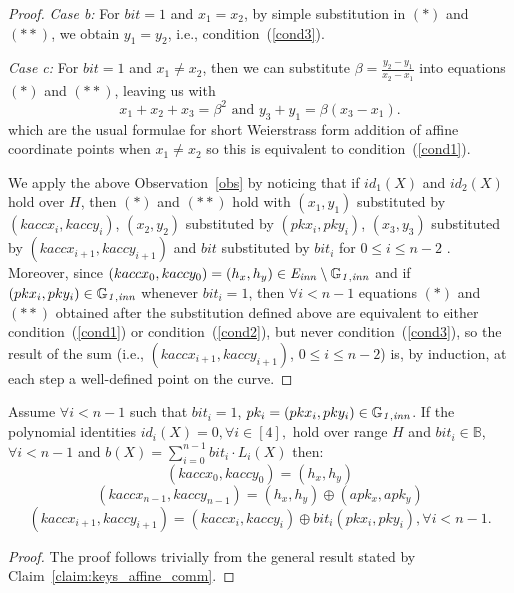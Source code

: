 \begin{proof}
\noindent \textit{Case b:} For $\mathit{bit}=1$ and $x_1=x_2$, by simple substitution in $(\ast)$ and $(\ast \ast)$, 
we obtain $y_1 = y_2$, i.e., condition~(\ref{cond3}).  \\
\vspace{-0.1in}

\noindent \textit{Case c:} For $\mathit{bit}=1$ and $x_1 \neq x_2$, then we can substitute
$\beta=\frac{y_2-y_1}{x_2-x_1}$ into equations $(\ast)$ and $(\ast \ast)$, leaving us with
$$x_1+x_2+x_3=\beta^2 \textrm{ and } y_3+y_1=\beta(x_3-x_1).$$
which are the usual formulae for short Weierstrass form addition of affine coordinate points when $x_1 \neq x_2$ 
so this is equivalent to condition~(\ref{cond1}). \\
\vspace{-0.1in}

\noindent We apply the above Observation~\ref{obs} by noticing that if $id_1(X)$ and $id_2(X)$ hold over $H$, 
then $(\ast)$ and $(\ast \ast)$ hold with $(x_1, y_1)$ substituted by $(kaccx_i,kaccy_i)$, $(x_2, y_2)$ 
substituted by $(pkx_i, pky_i)$, $(x_3, y_3)$ substituted by $(kaccx_{i+1},kaccy_{i+1})$ and $\mathit{bit}$ 
substituted by $\mathit{bit}_i$ for $0 \leq i \leq n-2$ %
. Moreover, since $(kaccx_{0}, kaccy_{0}) = (h_x, h_y) \in \mathit{E}_{\mathit{inn}} \setminus \mathbb{G}_{\mathit{1,inn}}$ 
and if $(pkx_i, pky_i) \in \mathbb{G}_{\mathit{1,inn}}$ whenever $\mathit{bit}_i = 1$, then $\forall i < n-1$ 
equations $(\ast)$ and $(\ast \ast)$ obtained after the substitution defined above are equivalent to either 
condition~(\ref{cond1}) or condition~(\ref{cond2}), but never condition~(\ref{cond3}), so the result of the sum (i.e., $(kaccx_{i+1}, kaccy_{i+1})$, $0\leq i \leq n-2$) is, 
by induction, at each step a well-defined point on the curve.%
\end{proof}
\vspace{-0.1in}

\begin{corollary} Assume $\forall i < n-1$ 
such that $\mathit{bit}_i = 1$, $pk_i = (pkx_i, pky_i) \in \mathbb{G}_{\mathit{1,inn}}$. 
If the polynomial identities $id_i(X) = 0, \forall i \in [4],$ hold over range $H$ and 
$\mathit{bit_i} \in \mathbb{B}$, $\forall i < n-1$ and $b(X) = \sum_{i=0}^{n-1} \mathit{bit_i} \cdot L_i(X)$
then:  \\
$$(kaccx_{0}, kaccy_{0}) = (h_x, h_y)$$ 
$$(kaccx_{n-1}, kaccy_{n-1}) = (h_x, h_y) \oplus (apk_x, apk_y)$$
$$(kaccx_{i+1}, kaccy_{i+1}) =  (kaccx_{i}, kaccy_{i}) \oplus \mathit{bit_i}(pkx_{i}, pky_{i}), \forall i < n-1.$$
\label{corollary:keys_affine_comm}
\end{corollary}
\vspace{-1cm}
\begin{proof}The proof follows trivially from the general result stated by Claim~\ref{claim:keys_affine_comm}. 
\end{proof}
\vspace{-0.1in}


